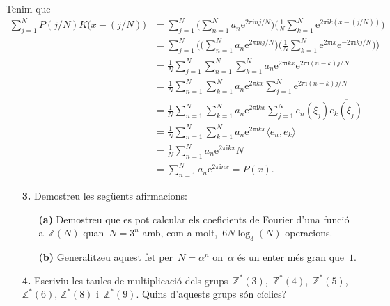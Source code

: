 \documentclass[a4paper]{article}
\theoremstyle{plain}
\theoremstyle{definition}
\newcommand{\iu}{\mathrm{i}}
\newcommand{\e}{\mathrm{e}}
\providecommand{\uppi}{\pi}
\newcommand{\conjugat}[1]{\overline{#1}}
\newcommand{\ZZ}{\mathbb{Z}}
\begin{document}
Tenim que
\begin{align*}
    \sum_{j=1}^{N}
    P(j/N)
    K\bigl(x-(j/N)\bigr)
    &=
    \sum_{j=1}^{N}
    \Biggl(
        \sum_{n=1}^{N}
        a_{n}\e^{2\uppi\iu nj/N}
    \Biggr)
    \Biggl(
        \frac{1}{N}
        \sum_{k=1}^{N}
        \e^{2\uppi\iu k(x-(j/N))}
    \Biggr) \\
    &=
    \sum_{j=1}^{N}
    \Biggl(
        \Biggl(
            \sum_{n=1}^{N}
            a_{n}
            \e^{2\uppi\iu nj/N}
        \Biggr)
        \Biggl(
            \frac{1}{N}
            \sum_{k=1}^{N}
            \e^{2\uppi\iu x}\e^{-2\uppi\iu kj/N}
        \Biggr)
    \Biggr) \\
    &=
    \frac{1}{N}
    \sum_{j=1}^{N}
    \sum_{n=1}^{N}
    \sum_{k=1}^{N}
    a_{n}
    \e^{2\uppi\iu kx}
    \e^{2\uppi\iu(n-k)j/N} \\
    &=
    \frac{1}{N}
    \sum_{n=1}^{N}
    \sum_{k=1}^{N}
    a_{n}\e^{2\uppi kx}
    \sum_{j=1}^{N}
    \e^{2\uppi\iu(n-k)j/N} \\
    &=
    \frac{1}{N}
    \sum_{n=1}^{N}
    \sum_{k=1}^{N}
    a_{n}
    \e^{2\uppi\iu kx}
    \sum_{j=1}^{N}
    e_{n}(\xi_{j})
    \conjugat{e_{k}(\xi_{j})} \\
    &=
    \frac{1}{N}
    \sum_{n=1}^{N}
    \sum_{k=1}^{N}
    a_{n}
    \e^{2\uppi\iu kx}
    \langle e_{n},e_{k}\rangle \\
    &=
    \frac{1}{N}
    \sum_{n=1}^{N}
    a_{n}
    \e^{2\uppi\iu kx}
    N \\
    &=
    \sum_{n=1}^{N}
    a_{n}
    \e^{2\uppi\iu nx}
    = P(x).
\end{align*}

\begin{enumerate}
    \item[\textbf{3.}] Demostreu les següents afirmacions:
        \begin{enumerate}
            \item[\textbf{(a)}] Demostreu que es pot calcular els coeficients de
                Fourier d'una funció a~\(\ZZ(N)\) quan~\(N=3^{n}\) amb, com a
                molt,~\(6N\log_{3}(N)\) operacions.
        \end{enumerate}
\end{enumerate}

\begin{enumerate}
    \item[]\begin{enumerate}
        \item[\textbf{(b)}] Generalitzeu aquest fet per~\(N=\alpha^{n}\)
            on~\(\alpha\) és un enter més gran que~\(1\).
    \end{enumerate}
\end{enumerate}

\begin{enumerate}
    \item[\textbf{4.}] Escriviu les taules de multiplicació dels
        grups~\(\ZZ^{\ast}(3)\),~\(\ZZ^{\ast}(4)\),~\(\ZZ^{\ast}(5)\),~\(\ZZ^{\ast}(6)\),
        \(\ZZ^{\ast}(8)\) i~\(\ZZ^{\ast}(9)\).
        Quins d'aquests grups són cíclics?
\end{enumerate}
\end{document}
